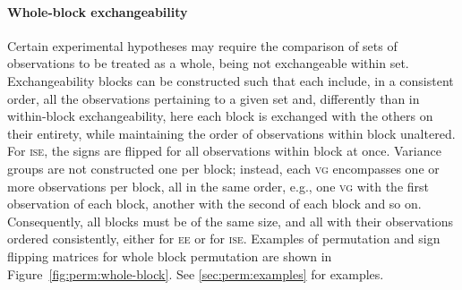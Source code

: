 \paragraph{Whole-block exchangeability}

Certain experimental hypotheses may require the comparison of sets of observations to be treated as a whole, being not exchangeable within set. Exchangeability blocks can be constructed such that each include, in a consistent order, all the observations pertaining to a given set and, differently than in within-block exchangeability, here each block is exchanged with the others on their entirety, while maintaining the order of observations within block unaltered. For \textsc{ise}, the signs are flipped for all observations within block at once. Variance groups are not constructed one per block; instead, each \textsc{vg} encompasses one or more observations per block, all in the same order, e.g., one \textsc{vg} with the first observation of each block, another with the second of each block and so on. Consequently, all blocks must be of the same size, and all with their observations ordered consistently, either for \textsc{ee} or for \textsc{ise}. Examples of permutation and sign flipping matrices for whole block permutation are shown in Figure~\ref{fig:perm:whole-block}. See \ref{sec:perm:examples} for examples.

